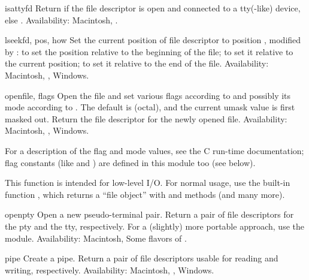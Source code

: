 \begin{funcdesc}{isatty}{fd}
Return  if the file descriptor  is open and
connected to a tty(-like) device, else .
Availability: Macintosh, \UNIX.
\end{funcdesc}

\begin{funcdesc}{lseek}{fd, pos, how}
Set the current position of file descriptor  to position
, modified by :  to set the position
relative to the beginning of the file;  to set it relative to
the current position;  to set it relative to the end of the
file.
Availability: Macintosh, \UNIX, Windows.
\end{funcdesc}

\begin{funcdesc}{open}{file, flags}
Open the file  and set various flags according to
 and possibly its mode according to .
The default  is  (octal), and the current umask
value is first masked out.  Return the file descriptor for the newly
opened file.
Availability: Macintosh, \UNIX, Windows.

For a description of the flag and mode values, see the C run-time
documentation; flag constants (like  and
) are defined in this module too (see below).

\begin{notice}
This function is intended for low-level I/O.  For normal usage,
use the built-in function , which returns a ``file
object'' with  and  methods (and many
more).
\end{notice}
\end{funcdesc}

\begin{funcdesc}{openpty}{}
Open a new pseudo-terminal pair. Return a pair of file descriptors
 for the pty and the tty,
respectively. For a (slightly) more portable approach, use the
 module.
Availability: Macintosh, Some flavors of \UNIX.
\end{funcdesc}

\begin{funcdesc}{pipe}{}
Create a pipe.  Return a pair of file descriptors  usable for reading and writing, respectively.
Availability: Macintosh, \UNIX, Windows.
\end{funcdesc}

